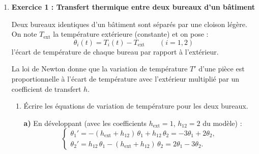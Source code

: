 \begin{enumerate}[itemsep=2em]

\item \textbf{ Exercice 1 : Transfert thermique entre deux bureaux d'un bâtiment}

\medskip

\begin{center}
\end{center}

\medskip

Deux bureaux identiques d'un bâtiment sont séparés par une cloison légère. On note $T_{\mathrm{ext}}$ la température extérieure (constante) et on pose :
\[
  \theta_i(t) = T_i(t) - T_{\mathrm{ext}} \qquad (i = 1,2)
\]
l'écart de température de chaque bureau par rapport à l'extérieur. 

La loi de Newton donne que la variation de température $T'$ d'une pièce est proportionnelle à l'écart de température avec l'extérieur multiplié par un coefficient de transfert $h$. 

\medskip

\begin{enumerate}[label=\alph*), itemsep=0.6em]
  \item Écrire les équations de variation de température pour les deux bureaux.

\begin{solution}
\textbf{a)} En développant (avec les coefficients $h_{\mathrm{ext}} = 1$, $h_{12} = 2$ du modèle) :
\[
\begin{cases}
\theta_1' = -(h_{\mathrm{ext}} + h_{12})\,\theta_1 + h_{12}\,\theta_2 = -3\theta_1 + 2\theta_2, \\[0.3em]
\theta_2' = h_{12}\,\theta_1 - (h_{\mathrm{ext}} + h_{12})\,\theta_2 = 2\theta_1 - 3\theta_2.
\end{cases}
\]
\end{solution}


\end{enumerate}
\end{enumerate}
